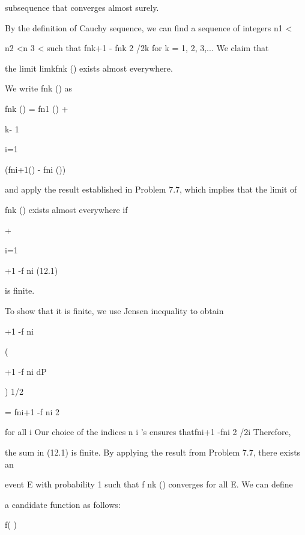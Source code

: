 subsequence that converges almost surely.

By the definition of Cauchy sequence, we can find a sequence of integers n1 <

n2 <n 3 < \cdot\cdot\cdot such that fnk+1 - fnk 2 /2k for k = 1, 2, 3,... We claim that

the limit limk\to\infty fnk () exists almost everywhere.

We write fnk () as

fnk () = fn1 () +

k- 1\sum

i=1

(fni+1() - fni ())

and apply the result established in Problem 7.7, which implies that the limit of

fnk () exists almost everywhere if

\int

\vertdP +

\infty\sum

i=1

\int

\vertfni+1 -f ni \vertdP (12.1)

is finite.

To show that it is finite, we use Jensen inequality to obtain

\int

\vertfni+1 -f ni \vertdP \leq

( \int

\vertfni+1 -f ni  dP

) 1/2

= fni+1 -f ni 2

for all i Our choice of the indices n i 's ensures thatfni+1 -fni 2  /2i Therefore,

the sum in (12.1) is finite. By applying the result from Problem 7.7, there exists an

event E with probability 1 such that f nk () converges for all \in E. We can define

a candidate function as follows:

f( )\coloneqq

